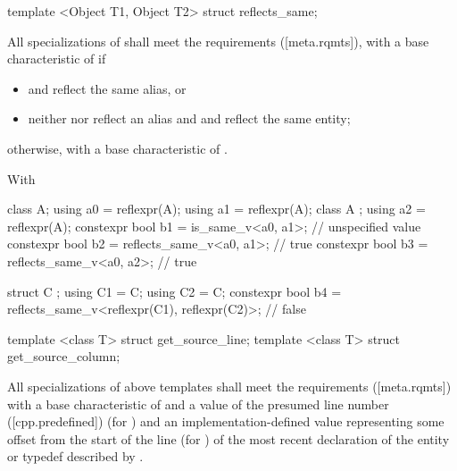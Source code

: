 \begin{std.txt}\color{addclr}

\begin{itemdecl}
template <Object T1, Object T2> struct reflects_same;
\end{itemdecl}

\begin{itemdescr}
\pnum
All specializations of  shall meet the  requirements ([meta.rqmts]),
    with a base characteristic of  if 
\begin{itemize}
  \item {} and  reflect the same alias, or
  \item neither  nor  reflect an alias and  and  reflect the same entity;
\end{itemize}
    otherwise, with a base characteristic of .

\pnum
\begin{example}
With
\begin{codeblock}
class A;
using a0 = reflexpr(A);
using a1 = reflexpr(A);
class A {};
using a2 = reflexpr(A);
constexpr bool b1 = is_same_v<a0, a1>; // unspecified value
constexpr bool b2 = reflects_same_v<a0, a1>; // true
constexpr bool b3 = reflects_same_v<a0, a2>; // true

struct C { };
using C1 = C;
using C2 = C;
constexpr bool b4 = reflects_same_v<reflexpr(C1), reflexpr(C2)>; // false
\end{codeblock}
\end{example}

\end{itemdescr}


\begin{itemdecl}
template <class T> struct get_source_line;
template <class T> struct get_source_column;
\end{itemdecl}

\begin{itemdescr}
All specializations of above templates shall meet the  requirements ([meta.rqmts]) with a base characteristic of  and a value of the presumed line number ([cpp.predefined]) (for ) and an implementation-defined value representing some offset from the start of the line (for ) of the most recent declaration of the entity or typedef described by .
\pnum


\end{itemdescr}
\end{std.txt}
